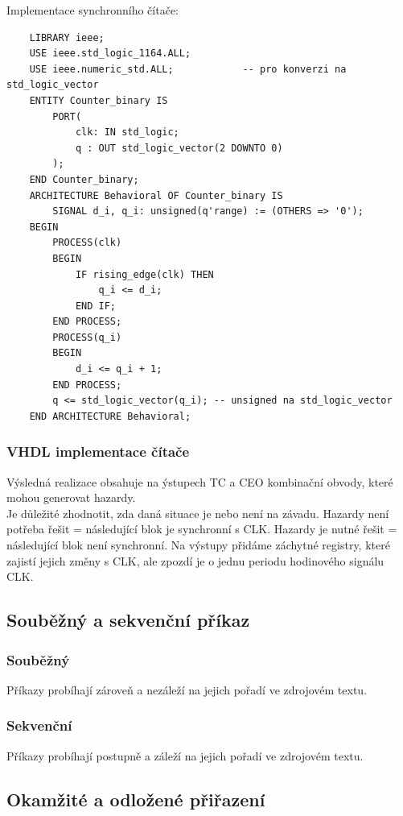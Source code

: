 Implementace synchronního čítače:\\
\begin{lstlisting}
    LIBRARY ieee;
    USE ieee.std_logic_1164.ALL;
    USE ieee.numeric_std.ALL;            -- pro konverzi na std_logic_vector
    ENTITY Counter_binary IS
        PORT(
            clk: IN std_logic;
            q : OUT std_logic_vector(2 DOWNTO 0)
        );
    END Counter_binary;
    ARCHITECTURE Behavioral OF Counter_binary IS
        SIGNAL d_i, q_i: unsigned(q'range) := (OTHERS => '0');
    BEGIN
        PROCESS(clk)
        BEGIN
            IF rising_edge(clk) THEN
                q_i <= d_i;             
            END IF;
        END PROCESS;
        PROCESS(q_i)
        BEGIN
            d_i <= q_i + 1;
        END PROCESS;
        q <= std_logic_vector(q_i); -- unsigned na std_logic_vector
    END ARCHITECTURE Behavioral;
\end{lstlisting}

\subsubsection{VHDL implementace čítače}
Výsledná realizace obsahuje na ýstupech TC a CEO kombinační obvody, které mohou generovat hazardy.\\
Je důležité zhodnotit, zda daná situace je nebo není na závadu. Hazardy není potřeba řešit = následující blok je synchronní s CLK. Hazardy je nutné řešit = následující blok není synchronní. Na výstupy přidáme záchytné registry, které zajistí jejich změny s CLK, ale zpozdí je o jednu periodu hodinového signálu CLK.\\

\subsection{Souběžný a sekvenční příkaz}
\subsubsection{Souběžný}
Příkazy probíhají zároveň a nezáleží na jejich pořadí ve zdrojovém textu.\\
\subsubsection{Sekvenční}
Příkazy probíhají postupně a záleží na jejich pořadí ve zdrojovém textu.\\
\subsection{Okamžité a odložené přiřazení}
